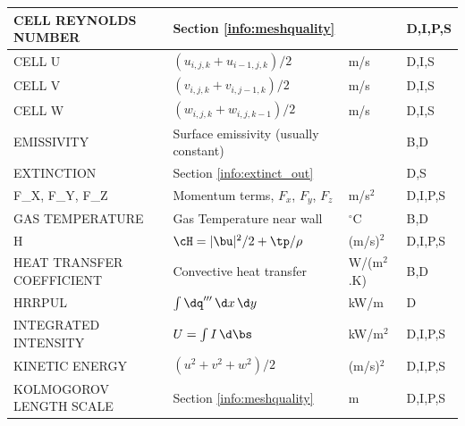 \documentclass[11pt]{book}
\begin{document}
\begin{longtable}{@{\extracolsep{\fill}}|l|l|l|l|}
{\ct CELL REYNOLDS NUMBER}                      & Section \ref{info:meshquality}                    &                & D,I,P,S      \\ \hline
{\ct CELL U}                                    & $(u_{i,j,k}+u_{i-1,j,k})/2$                       & m/s            & D,I,S        \\ \hline
{\ct CELL V}                                    & $(v_{i,j,k}+v_{i,j-1,k})/2$                       & m/s            & D,I,S        \\ \hline
{\ct CELL W}                                    & $(w_{i,j,k}+w_{i,j,k-1})/2$                       & m/s            & D,I,S        \\ \hline
{\ct EMISSIVITY}                                & Surface emissivity (usually constant)             &                & B,D          \\ \hline
{\ct EXTINCTION}                                & Section \ref{info:extinct_out}                    &                & D,S          \\ \hline
{\ct F\_X, F\_Y, F\_Z}                          & Momentum terms, $F_x$, $F_y$, $F_z$               & m/s$^2$        & D,I,P,S      \\ \hline
{\ct GAS TEMPERATURE}                           & Gas Temperature near wall                         & $^\circ$C      & B,D          \\ \hline
{\ct H}                                         & $\cH=|\bu|^2/2 + \tp/\rho    $                    & (m/s)$^2$      & D,I,P,S        \\ \hline
{\ct HEAT TRANSFER COEFFICIENT}                 & Convective heat transfer                          & \si{W/(m$^2$.K)} & B,D        \\ \hline
{\ct HRRPUL}                                    & $\int \dq''' \, \d x \, \d y$                     & kW/m           & D            \\ \hline
{\ct INTEGRATED INTENSITY}                      & $U=\int I \, \d \bs$                              & kW/m$^2$       & D,I,P,S      \\ \hline
{\ct KINETIC ENERGY}                            & $(u^2+v^2+w^2)/2$                                 & (m/s)$^2$      & D,I,P,S      \\ \hline
{\ct KOLMOGOROV LENGTH SCALE}                   & Section \ref{info:meshquality}                    & m              & D,I,P,S      \\ \hline

\end{longtable}
\end{document}
